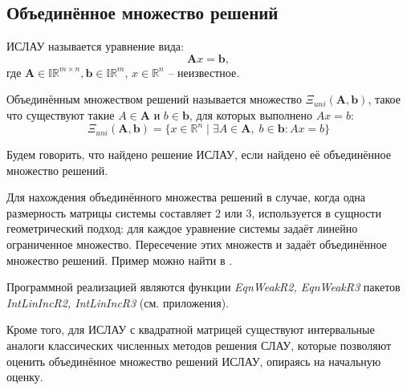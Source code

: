 \subsection{Объединённое множество решений}

\begin{definition}[ИСЛАУ]
	ИСЛАУ называется уравнение вида:
	\begin{equation}
		\mathbf{A}x = \mathbf{b},
	\end{equation}
	где $\mathbf{A} \in \mathbb{IR}^{m \times n}, \mathbf{b} \in \mathbb{IR}^m$, $x \in \mathbb{R}^n$ -- неизвестное.
\end{definition}

\begin{definition}
	Объединённым множеством решений называется множество $\Xi_{uni}(\mathbf{A}, \mathbf{b})$, такое что существуют такие $A \in \mathbf{A}$ и $b \in \mathbf{b}$, для которых выполнено $Ax = b$:
	\begin{equation}
	\Xi_{uni}(\mathbf{A}, \mathbf{b}) = \{ x \in \mathbb{R}^n \; | \; \exists A \in \mathbf{A}, \; b \in \mathbf{b}: Ax = b \}
	\end{equation}
\end{definition}

Будем говорить, что найдено решение ИСЛАУ, если найдено её объединённое множество решений.

Для нахождения объединённого множества решений в случае, когда одна размерность матрицы системы составляет 2 или 3, используется в сущности геометрический подход: для каждое уравнение системы задаёт линейно ограниченное множество. Пересечение этих множеств и задаёт объединённое множество решений. Пример можно найти в \cite[стр. 39, рис. 15]{intv}.

Программной реализацией являются функции \textit{EqnWeakR2, EqnWeakR3} пакетов \textit{IntLinIncR2, IntLinIncR3} (см. приложения).

Кроме того, для ИСЛАУ с квадратной матрицей существуют интервальные аналоги классических численных методов решения СЛАУ, которые позволяют оценить объединённое множество решений ИСЛАУ, опираясь на начальную оценку.

